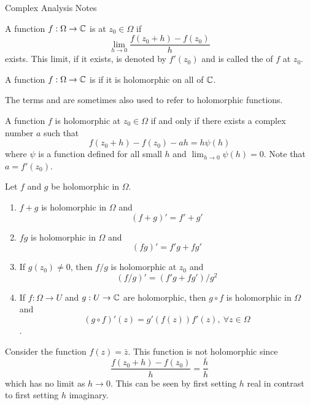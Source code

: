 \documentclass{mathnotes}
\begin{document}
\begin{center}
  \vspace*{20pt}
  \LARGE{Complex Analysis Notes}
\end{center}

\begin{bdefi}
  A function $f:\Omega\to\mathbb{C}$ is  at $z_0\in\Omega$ if
  $$\lim_{h\to0}\frac{f(z_0+h)-f(z_0)}{h}$$
  exists. This limit, if it exists, is denoted by $f'(z_0)$ and is called the
   of $f$ at $z_0$.
\end{bdefi}

\begin{defi}
  A function $f:\Omega\to\mathbb{C}$ is  if it is holomorphic on all of
  $\mathbb{C}$.
\end{defi}

\begin{defi}
  The terms  and  are sometimes
  also used to refer to holomorphic functions.
\end{defi}

\begin{prop}
  A function $f$ is holomorphic at $z_0\in\Omega$ if and only if there exists a
  complex number $a$ such that
  $$f(z_0+h)-f(z_0)-ah=h\psi(h)$$
  where $\psi$ is a function defined for all small $h$ and
  $\lim_{h\to0}\psi(h)=0$. Note that $a=f'(z_0)$.
\end{prop}

\begin{prop}
  Let $f$ and $g$ be holomorphic in $\Omega$.
  \begin{enumerate}
    \item $f+g$ is holomorphic in $\Omega$ and
      $$(f+g)'=f'+g'$$
    \item $fg$ is holomorphic in $\Omega$ and
      $$(fg)'=f'g+fg'$$
    \item If $g(z_0)\ne0$, then $f/g$ is holomorphic at $z_0$ and
      $$(f/g)'=(f'g+fg')/g^2$$
    \item If $f:\Omega\to U$ and $g:U\to\mathbb{C}$ are holomorphic, then $g\circ f$
      is holomorphic in $\Omega$ and
      $$(g\circ f)'(z)=g'(f(z))f'(z),\ \forall z\in\Omega$$.
  \end{enumerate}
\end{prop}

\begin{ex}
  Consider the function $f(z)=\bar z$. This function is not holomorphic since
  $$\frac{f(z_0+h)-f(z_0)}{h}=\frac{\bar h}{h}$$
  which has no limit as $h\to0$. This can be seen by first setting $h$ real in
  contrast to first setting $h$ imaginary.
\end{ex}
\end{document}
